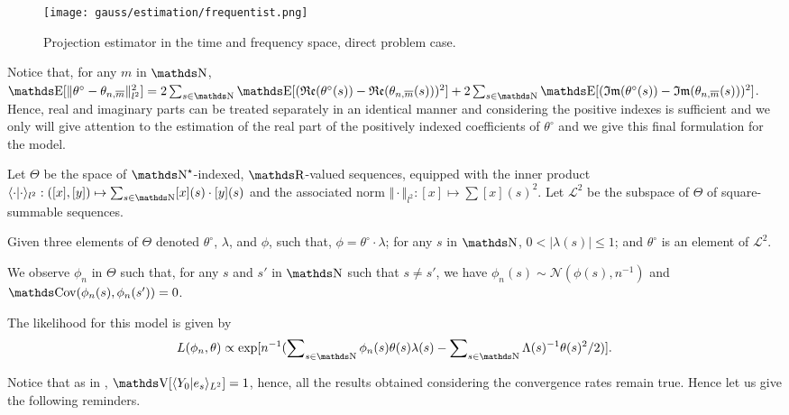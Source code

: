 \begin{figure}
  \centering
  \texttt{[image: gauss/estimation/frequentist.png]}
  \caption{Projection estimator in the time and frequency space, direct problem case.}
\label{igssm:estimation}
\end{figure}

Notice that, for any $m$ in $\N$, $\E[\Vert \theta^{\circ} - \theta_{n, \overline{m}} \Vert_{l^{2}}^{2}] = 2 \sum_{s \in \N} \E[(\Re(\theta^{\circ}(s)) - \Re(\theta_{n, \overline{m}}(s)))^{2}] + 2 \sum_{s \in \N} \E[(\Im(\theta^{\circ}(s)) - \Im(\theta_{n, \overline{m}}(s)))^{2}]$.
Hence, real and imaginary parts can be treated separately in an identical manner and considering the positive indexes is sufficient and we only will give attention to the estimation of the real part of the positively indexed coefficients of $\theta^{\circ}$ and we give this final formulation for the model.

\begin{de}\label{INTRO_IGSSM_DE}
Let $\Theta$ be the space of $\N^{\star}$-indexed, $\R$-valued sequences, equipped with the inner product $\langle \cdot \vert \cdot \rangle_{l^{2}} : ([x], [y]) \mapsto \sum_{s \in \N} [x](s) \cdot [y](s)$ and the associated norm $\Vert \cdot \Vert_{l^{2}}: [x] \mapsto \sum[x](s)^{2}$.
Let $\mathcal{L}^{2}$ be the subspace of $\Theta$ of square-summable sequences.

Given three elements of $\Theta$ denoted $\theta^{\circ}$, $\lambda$, and $\phi$, such that, $\phi = \theta^{\circ} \cdot \lambda$; for any $s$ in $\N$, $0 < \vert \lambda(s) \vert \leq 1$; and $\theta^{\circ}$ is an element of $\mathcal{L}^{2}$.

We observe $\phi_{n}$ in $\Theta$ such that, for any $s$ and $s'$ in $\N$ such that $s \neq s'$, we have $\phi_{n}(s) \sim \mathcal{N}(\phi(s), n^{-1})$ and $\Cov(\phi_{n}(s), \phi_{n}(s')) = 0$.
\assEnd
\end{de}

The likelihood for this model is given by
\[L(\phi_{n}, \theta) \propto \exp[n^{-1}(\sum\nolimits_{s \in \N} \phi_{n}(s) \theta(s) \lambda(s) - \sum\nolimits_{s \in \N} \Lambda(s)^{-1}\theta(s)^{2}/2)].\]

Notice that as in , $\V[\langle Y_{0}\vert e_{s} \rangle_{L^{2}}] = 1$, hence, all the results obtained considering the convergence rates remain true.
Hence let us give the following reminders.

